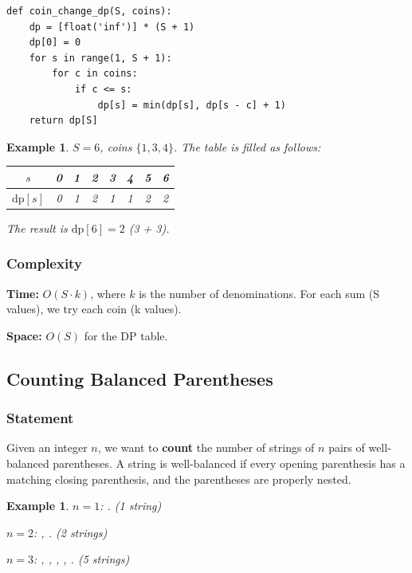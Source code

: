 \documentclass[11pt,a4paper]{article}
\newtheorem{example}[theorem]{Example}
\newcommand{\code}[1]{\texttt{\detokenize{#1}}}
\begin{document}
\begin{lstlisting}
def coin_change_dp(S, coins):
    dp = [float('inf')] * (S + 1)
    dp[0] = 0
    for s in range(1, S + 1):
        for c in coins:
            if c <= s:
                dp[s] = min(dp[s], dp[s - c] + 1)
    return dp[S]
\end{lstlisting}

\begin{example}
\(S = 6\), coins \(\{1, 3, 4\}\). The table is filled as follows:
\begin{center}
\begin{tabular}{c|ccccccc}
\toprule
\(s\) & 0 & 1 & 2 & 3 & 4 & 5 & 6 \\
\midrule
\(\mathrm{dp}[s]\) & 0 & 1 & 2 & 1 & 1 & 2 & 2 \\
\bottomrule
\end{tabular}
\end{center}
The result is \(\mathrm{dp}[6] = 2\) (3 + 3).
\end{example}

\subsubsection{Complexity}

\textbf{Time:} \(O(S \cdot k)\), where \(k\) is the number of denominations. For each sum (S values), we try each coin (k values).

\textbf{Space:} \(O(S)\) for the DP table.

\subsection{Counting Balanced Parentheses}

\subsubsection{Statement}

Given an integer \(n\), we want to \textbf{count} the number of strings of \(n\) pairs of well-balanced parentheses. A string is well-balanced if every opening parenthesis has a matching closing parenthesis, and the parentheses are properly nested.

\begin{example}
\(n = 1\): \code{()}. (1 string)

\(n = 2\): \code{(())}, \code{()()}. (2 strings)

\(n = 3\): \code{((()))}, \code{(()())}, \code{(())()}, \code{()(())}, \code{()()()}. (5 strings)
\end{example}
\end{document}

